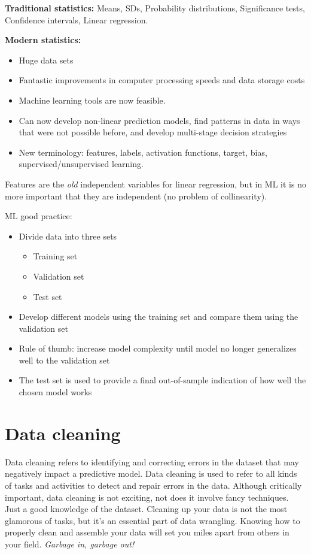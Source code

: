 \textbf{Traditional statistics:} Means, SDs, Probability distributions, Significance tests, Confidence intervals, Linear regression.

\textbf{Modern statistics:}
\begin{itemize}
    \item Huge data sets 
    \item Fantastic improvements in computer processing speeds and data storage costs
    \item Machine learning tools are now feasible.
    \item Can now develop non-linear prediction models, find patterns in data in ways that were not possible before, and develop multi-stage decision strategies
    \item New terminology: features, labels, activation functions, target, bias, supervised/unsupervised learning.
\end{itemize}

Features are the \textit{old} independent variables for linear regression, but in ML it is no more important that they are independent (no problem of collinearity).

ML good practice:
\begin{itemize}
    \item Divide data into three sets
          \begin{itemize}
              \item Training set
              \item Validation set
              \item Test set
          \end{itemize}
    \item Develop different models using the training set and compare them using the validation set
    \item Rule of thumb: increase model complexity until model no longer generalizes well to the validation set
    \item The test set is used to provide a final out-of-sample indication of how well the chosen model works
\end{itemize}

\section{Data cleaning}

Data cleaning refers to identifying and correcting errors in the dataset that may negatively impact a predictive model. Data cleaning is used to refer to all kinds of tasks and activities to detect and repair errors in the data. Although critically important, data cleaning is not exciting, not does it involve fancy techniques. Just a good knowledge of the dataset. Cleaning up your data is not the most glamorous of tasks, but it’s an essential part of data wrangling. Knowing how to properly clean and assemble your data will set you miles apart from others in your field. \textit{Garbage in, garbage out!}

